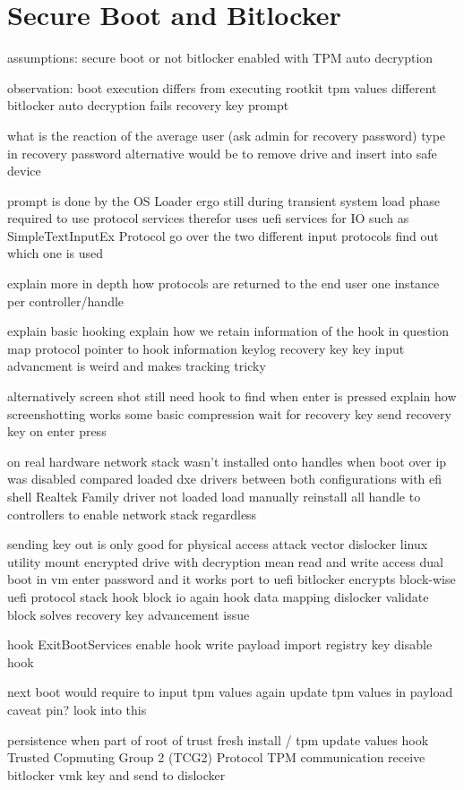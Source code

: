 \section{Secure Boot and Bitlocker}
assumptions:
secure boot or not
bitlocker enabled with TPM auto decryption

observation:
boot execution differs from executing rootkit
tpm values different
bitlocker auto decryption fails
recovery key prompt

what is the reaction of the average user
(ask admin for recovery password)
type in recovery password
alternative would be to remove drive and insert into safe device

prompt is done by the OS Loader
ergo still during transient system load phase
required to use protocol services
therefor uses uefi services for IO
such as SimpleTextInputEx Protocol
go over the two different input protocols
find out which one is used

explain more in depth how protocols are returned to the end user
one instance per controller/handle

explain basic hooking
explain how we retain information of the hook in question
map protocol pointer to hook information
keylog recovery key
key input advancment is weird and makes tracking tricky

alternatively screen shot
still need hook to find when enter is pressed
explain how screenshotting works
some basic compression
wait for recovery key
send recovery key on enter press

on real hardware
network stack wasn't installed onto handles when boot over ip was disabled
compared loaded dxe drivers between both configurations with efi shell
Realtek Family driver not loaded
load manually
reinstall all handle to controllers to enable network stack regardless

sending key out is only good for physical access attack vector
dislocker linux utility
mount encrypted drive with decryption mean
read and write access
dual boot in vm
enter password and it works
port to uefi
bitlocker encrypts block-wise
uefi protocol stack
hook block io
again hook data mapping
dislocker validate block
solves recovery key advancement issue

hook ExitBootServices
enable hook
write payload
import registry key
disable hook

next boot would require to input tpm values again
update tpm values in payload
caveat pin? look into this

persistence when part of root of trust
fresh install / tpm update values
hook Trusted Copmuting Group 2 (TCG2) Protocol
TPM communication
receive bitlocker vmk key and send to dislocker